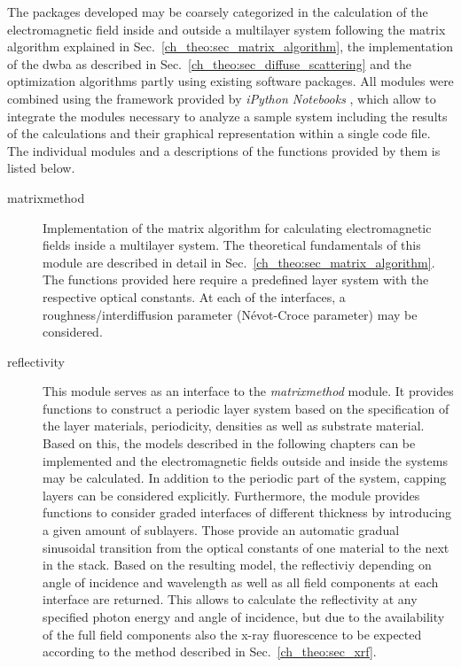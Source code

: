 The packages developed may be coarsely categorized in the calculation of the electromagnetic field inside and outside a multilayer system following the matrix algorithm explained in Sec.~\ref{ch_theo:sec_matrix_algorithm}, the implementation of the \gls{dwba} as described in Sec.~\ref{ch_theo:sec_diffuse_scattering} and the optimization algorithms partly using existing software packages. All modules were combined using the framework provided by \emph{iPython Notebooks} \cite{perez_ipython:_2007}, which allow to integrate the modules necessary to analyze a sample system including the results of the calculations and their graphical representation within a single code file. The individual modules and a descriptions of the functions provided by them is listed below.
\begin{description}
 \item[matrixmethod]{Implementation of the matrix algorithm for calculating electromagnetic fields inside a multilayer system. The theoretical fundamentals of this module are described in detail in Sec.~\ref{ch_theo:sec_matrix_algorithm}. The functions provided here require a predefined layer system with the respective optical constants. At each of the interfaces, a roughness/interdiffusion parameter (N\'{e}vot-Croce parameter) may be considered.}
 
 \item[reflectivity]{This module serves as an interface to the \emph{matrixmethod} module. It provides functions to construct a periodic layer system based on the specification of the layer materials, periodicity, densities as well as substrate material. Based on this, the models described in the following chapters can be implemented and the electromagnetic fields outside and inside the systems may be calculated. In addition to the periodic part of the system, capping layers can be considered explicitly. Furthermore, the module provides functions to consider graded interfaces of different thickness by introducing a given amount of sublayers. Those provide an automatic gradual sinusoidal transition from the optical constants of one material to the next in the stack. Based on the resulting model, the reflectiviy depending on angle of incidence and wavelength as well as all field components at each interface are returned. This allows to calculate the reflectivity at any specified photon energy and angle of incidence, but due to the availability of the full field components also the x-ray fluorescence to be expected according to the method described in Sec.~\ref{ch_theo:sec_xrf}.}
 

\end{description}
